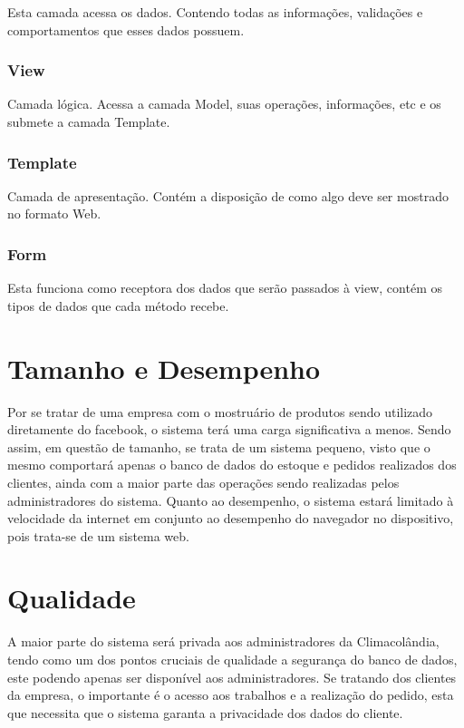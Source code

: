 Esta camada acessa os dados. Contendo todas as informações, validações e comportamentos que esses dados possuem.

\subsubsection{View}

Camada lógica. Acessa a camada Model, suas operações, informações, etc e os submete a camada Template.

\subsubsection{Template}

Camada  de apresentação. Contém a disposição de como algo deve ser mostrado no formato Web.

\subsubsection{Form}

Esta funciona como receptora dos dados que serão passados à view, contém os tipos de dados que cada método recebe.

\section{Tamanho e Desempenho}

Por se tratar de uma empresa com o mostruário de produtos sendo utilizado diretamente do facebook, o sistema terá uma carga significativa a menos. Sendo assim, em questão de tamanho, se trata de um sistema pequeno, visto que o mesmo comportará apenas o banco de dados do estoque e pedidos realizados dos clientes, ainda com a maior parte das operações sendo realizadas pelos administradores do sistema. Quanto ao desempenho, o sistema estará limitado à velocidade da internet em conjunto ao desempenho do navegador no dispositivo, pois trata-se de um sistema web.

\section{Qualidade}

A maior parte do sistema será privada aos administradores da Climacolândia, tendo como um dos pontos cruciais de qualidade a segurança do banco de dados, este podendo apenas ser disponível aos administradores. Se tratando dos clientes da empresa, o importante é o acesso aos trabalhos e a realização do pedido, esta que necessita que o sistema garanta a privacidade dos dados do cliente. 